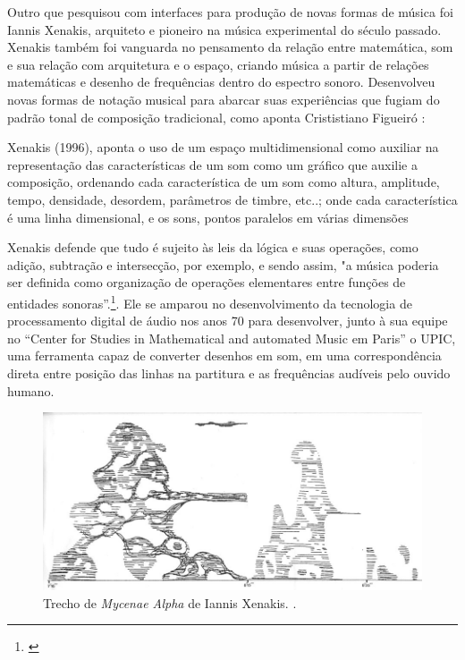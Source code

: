 Outro que pesquisou com interfaces para produção de novas formas de música foi Iannis Xenakis, arquiteto e pioneiro na música experimental do século passado. Xenakis também foi vanguarda no pensamento da relação entre matemática, som e sua relação com arquitetura e o espaço, criando música a partir de relações matemáticas e desenho de frequências dentro do espectro sonoro. Desenvolveu novas formas de notação musical para abarcar suas experiências que fugiam do padrão tonal de composição tradicional, como aponta Crististiano Figueiró \citeyear{figueiro2013influencia}:

\begin{citacao}
Xenakis (1996), aponta o uso de um espaço multidimensional como auxiliar na representação das características de um som como um gráfico que auxilie a composição, ordenando cada característica de um som como altura, amplitude, tempo, densidade, desordem, parâmetros de timbre, etc..; onde cada característica é uma linha dimensional, e os sons, pontos paralelos em várias dimensões \cite{figueiro2013influencia}
\end{citacao}

Xenakis defende que tudo é sujeito às leis da lógica e suas operações, como adição, subtração e intersecção, por exemplo, e sendo assim, "a música poderia ser definida como organização de operações elementares entre funções de entidades sonoras”.\footnote{\cite[21]{Xenakis1971}}. Ele se amparou no desenvolvimento da tecnologia de processamento digital de áudio nos anos 70 para desenvolver, junto à sua equipe no ``Center for Studies in Mathematical and automated Music em Paris'' o UPIC, uma ferramenta capaz de converter desenhos em som, em uma correspondência direta entre posição das linhas na partitura e as frequências audíveis pelo ouvido humano.


\begin{figure}
    \caption{\label{xenakis}Trecho de \textit{Mycenae Alpha} de Iannis Xenakis.
.}
    
        \includegraphics[width=1\linewidth]{pictures/cap2/metastasis}
    
\end{figure}


